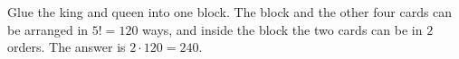 Glue the king and queen into one block. The block and the other four cards can be arranged in $5!=120$ ways, and inside the block the two cards can be in $2$ orders. The answer is $2\cdot120=\boxed{240}$.
